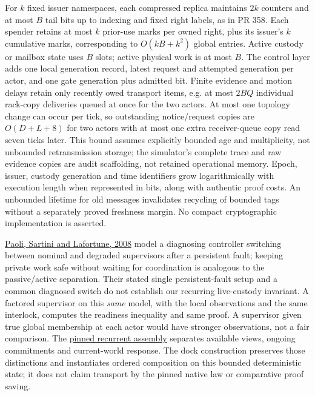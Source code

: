 \documentclass[11pt]{article}
\begin{document}
For $k$ fixed issuer namespaces, each compressed replica maintains $2k$ counters and at most $B$ tail bits up to indexing and fixed right labels, as in PR 358. Each spender retains at most $k$ prior-use marks per owned right, plus its issuer's $k$ cumulative marks, corresponding to $O(kB+k^2)$ global entries. Active custody or mailbox state uses $B$ slots; active physical work is at most $B$. The control layer adds one local generation record, latest request and attempted generation per actor, and one gate generation plus admitted bit. Finite evidence and motion delays retain only recently owed transport items, e.g. at most $2BQ$ individual rack-copy deliveries queued at once for the two actors. At most one topology change can occur per tick, so outstanding notice/request copies are $O(D+L+8)$ for two actors with at most one extra receiver-queue copy read seven ticks later. This bound assumes explicitly bounded age and multiplicity, not unbounded retransmission storage; the simulator's complete trace and raw evidence copies are audit scaffolding, not retained operational memory. Epoch, issuer, custody generation and time identifiers grow logarithmically with execution length when represented in bits, along with authentic proof costs. An unbounded lifetime for old messages invalidates recycling of bounded tags without a separately proved freshness margin. No compact cryptographic implementation is asserted.

\href{https://skoge.folk.ntnu.no/prost/proceedings/ifac2008/data/papers/1774.pdf}{Paoli, Sartini and Lafortune, 2008} model a diagnosing controller switching between nominal and degraded supervisors after a persistent fault; keeping private work safe without waiting for coordination is analogous to the passive/active separation. Their stated single persistent-fault setup and a common diagnosed switch do not establish our recurring live-custody invariant. A factored supervisor on this \emph{same} model, with the local observations and the same interlock, computes the readiness inequality and same proof. A supervisor given true global membership at each actor would have stronger observations, not a fair comparison. The \href{https://github.com/eternal-november/eos-research-programmes/blob/e1348964f73704212d2d8b48d5982a5ed600a2ff/projects/contextual-composition/foundations/native-whole-scope-feedback/Nonblocking_Recurrent_Assembly_Reading_Route.tex}{pinned recurrent assembly} separates available views, ongoing commitments and current-world response. The dock construction preserves those distinctions and instantiates ordered composition on this bounded deterministic state; it does not claim transport by the pinned native law or comparative proof saving.
\end{document}
